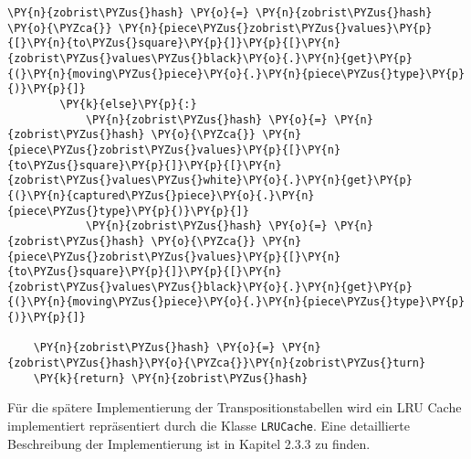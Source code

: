 \begin{tcolorbox}[fontupper=\linespread{.66}\selectfont, breakable, size=fbox, boxrule=1pt, pad at break*=1mm,colback=cellbackground, colframe=cellborder]
\begin{Verbatim}[commandchars=\\\{\}]
            \PY{n}{zobrist\PYZus{}hash} \PY{o}{=} \PY{n}{zobrist\PYZus{}hash} \PY{o}{\PYZca{}} \PY{n}{piece\PYZus{}zobrist\PYZus{}values}\PY{p}{[}\PY{n}{to\PYZus{}square}\PY{p}{]}\PY{p}{[}\PY{n}{zobrist\PYZus{}values\PYZus{}black}\PY{o}{.}\PY{n}{get}\PY{p}{(}\PY{n}{moving\PYZus{}piece}\PY{o}{.}\PY{n}{piece\PYZus{}type}\PY{p}{)}\PY{p}{]}
        \PY{k}{else}\PY{p}{:}
            \PY{n}{zobrist\PYZus{}hash} \PY{o}{=} \PY{n}{zobrist\PYZus{}hash} \PY{o}{\PYZca{}} \PY{n}{piece\PYZus{}zobrist\PYZus{}values}\PY{p}{[}\PY{n}{to\PYZus{}square}\PY{p}{]}\PY{p}{[}\PY{n}{zobrist\PYZus{}values\PYZus{}white}\PY{o}{.}\PY{n}{get}\PY{p}{(}\PY{n}{captured\PYZus{}piece}\PY{o}{.}\PY{n}{piece\PYZus{}type}\PY{p}{)}\PY{p}{]}
            \PY{n}{zobrist\PYZus{}hash} \PY{o}{=} \PY{n}{zobrist\PYZus{}hash} \PY{o}{\PYZca{}} \PY{n}{piece\PYZus{}zobrist\PYZus{}values}\PY{p}{[}\PY{n}{to\PYZus{}square}\PY{p}{]}\PY{p}{[}\PY{n}{zobrist\PYZus{}values\PYZus{}black}\PY{o}{.}\PY{n}{get}\PY{p}{(}\PY{n}{moving\PYZus{}piece}\PY{o}{.}\PY{n}{piece\PYZus{}type}\PY{p}{)}\PY{p}{]}
            
    \PY{n}{zobrist\PYZus{}hash} \PY{o}{=} \PY{n}{zobrist\PYZus{}hash}\PY{o}{\PYZca{}}\PY{n}{zobrist\PYZus{}turn}
    \PY{k}{return} \PY{n}{zobrist\PYZus{}hash}
\end{Verbatim}
\end{tcolorbox}

    Für die spätere Implementierung der Transpositionstabellen wird ein LRU
Cache implementiert repräsentiert durch die Klasse \texttt{LRUCache}.
Eine detaillierte Beschreibung der Implementierung ist in Kapitel 2.3.3
zu finden.

\bigskip

